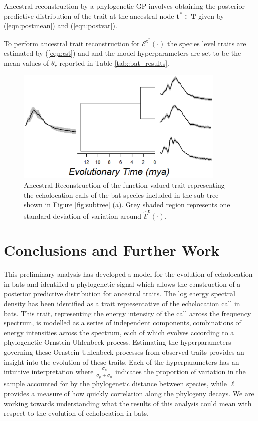 \documentclass{ws-rv9x6}
\begin{document}
Ancestral reconstruction by a phylogenetic GP involves obtaining the posterior predictive distribution of the trait at the ancestral node \(\mathbf{t}^* \in \mathbf{T}\) given by (\ref{eqn:postmean}) and (\ref{eqn:postvar}).

To perform ancestral trait reconstruction for \(\mathcal{E}^{\mathbf{t}^*}(\cdot)\) the species level traits are estimated by (\ref{eqn:est}) and and the model hyperparameters are set to be the mean values of \(\theta_r\) reported in Table \ref{tab::bat_results}.

\begin{figure}[h]
	\centering
	\includegraphics[width = 0.9\textwidth]{../Figures/ancrec.eps}
	\caption{Ancestral Reconstruction of the function valued trait representing the echolocation calls of the bat species included in the sub tree shown in Figure  \ref{fig:subtree} (a). Grey shaded region represents one standard deviation of variation around \(\hat{\mathcal{E}}^{\mathbf{t}}(\cdot)\).}
\end{figure}

\section{Conclusions and Further Work}
\label{sec:conc}
This preliminary analysis has developed a model for the evolution of echolocation in bats and identified a phylogenetic signal which allows the construction of a posterior predictive distribution for ancestral traits. The log energy spectral density has been identified as a trait representative of the echolocation call in bats. This trait, representing the energy intensity of the call across the frequency spectrum, is modelled as a series of independent components, combinations of energy intensities across the spectrum, each of which evolves according to a phylogenetic Ornstein-Uhlenbeck process. Estimating the hyperparameters governing these Ornstein-Uhlenbeck processes from observed traits provides an insight into the evolution of these traits. Each of the hyperparameters has an intuitive interpretation where \(\frac{\sigma_p}{\sigma_p + \sigma_n}\) indicates the proportion of variation in the sample accounted for by the phylogenetic distance between species, while \(\ell\) provides a measure of how quickly correlation along the phylogeny decays. We are working towards understanding what the results of this analysis could mean with respect to the evolution of echolocation in bats.
\end{document}
